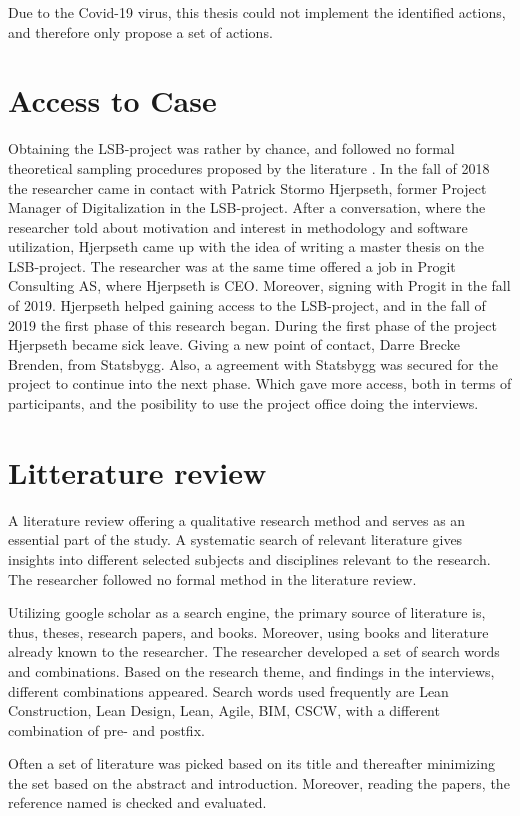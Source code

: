 Due to the Covid-19 virus, this thesis could not implement the identified actions, and therefore only propose a set of actions.

\section{Access to Case}
Obtaining the LSB-project was rather by chance, and followed no formal theoretical sampling procedures proposed by the literature \citep{yin1993case}. In the fall of 2018 the researcher came in contact with Patrick Stormo Hjerpseth, former Project Manager of Digitalization in the LSB-project. After a conversation, where the researcher told about motivation and interest in methodology and software utilization, Hjerpseth came up with the idea of writing a master thesis on the LSB-project. The researcher was at the same time offered a job in Progit Consulting AS, where Hjerpseth is CEO. Moreover, signing with Progit in the fall of 2019. Hjerpseth helped gaining access to the LSB-project, and in the fall of 2019 the first phase of this research began. During the first phase of the project Hjerpseth became sick leave. Giving a new point of contact, Darre Brecke Brenden, from Statsbygg. Also, a agreement with Statsbygg was secured for the project to continue into the next phase. Which gave more access, both in terms of participants, and the posibility to use the project office doing the interviews.  

\section{Litterature review}
A literature review offering a qualitative research method and serves as an essential part of the study. A systematic search of relevant literature gives insights into different selected subjects and disciplines relevant to the research. The researcher followed no formal method in the literature review.

Utilizing google scholar as a search engine, the primary source of literature is, thus, theses, research papers, and books. Moreover, using books and literature already known to the researcher. The researcher developed a set of search words and combinations. Based on the research theme, and findings in the interviews, different combinations appeared. Search words used frequently are Lean Construction, Lean Design, Lean, Agile, BIM, CSCW, with a different combination of pre- and postfix. 

Often a set of literature was picked based on its title and thereafter minimizing the set based on the abstract and introduction. Moreover, reading the papers, the reference named is checked and evaluated. 

